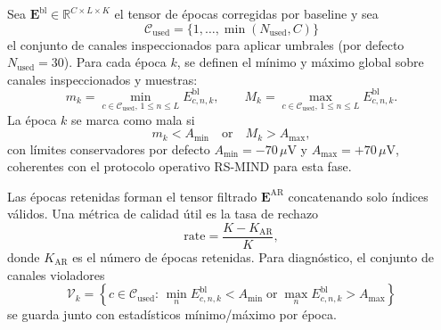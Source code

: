Sea $\mathbf{E}^{\mathrm{bl}}\in\mathbb{R}^{C\times L\times K}$ el tensor de épocas corregidas por baseline y sea
\[
\mathcal{C}_{\mathrm{used}}=\{1,\dots,\min(N_{\mathrm{used}},C)\}
\]
el conjunto de canales inspeccionados para aplicar umbrales (por defecto $N_{\mathrm{used}}=30$). Para cada época $k$, se definen el mínimo y máximo global sobre canales inspeccionados y muestras:
\[
m_k=\min_{c\in\mathcal{C}_{\mathrm{used}},\,1\le n\le L}E^{\mathrm{bl}}_{c,n,k},
\qquad
M_k=\max_{c\in\mathcal{C}_{\mathrm{used}},\,1\le n\le L}E^{\mathrm{bl}}_{c,n,k}.
\]
La época $k$ se marca como mala si
\[
m_k<A_{\min}\quad\text{or}\quad M_k>A_{\max},
\]
con límites conservadores por defecto $A_{\min}=-70\,\mu\mathrm{V}$ y $A_{\max}=+70\,\mu\mathrm{V}$, coherentes con el protocolo operativo RS-MIND para esta fase.

Las épocas retenidas forman el tensor filtrado $\mathbf{E}^{\mathrm{AR}}$ concatenando solo índices válidos. Una métrica de calidad útil es la tasa de rechazo
\[
\mathrm{rate}=\frac{K-K_{\mathrm{AR}}}{K},
\]
donde $K_{\mathrm{AR}}$ es el número de épocas retenidas. Para diagnóstico, el conjunto de canales violadores
\[
\mathcal{V}_k=
\left\{
c\in\mathcal{C}_{\mathrm{used}}:\,
\min_n E^{\mathrm{bl}}_{c,n,k}<A_{\min}
\;\text{or}\;
\max_n E^{\mathrm{bl}}_{c,n,k}>A_{\max}
\right\}
\]
se guarda junto con estadísticos mínimo/máximo por época.

